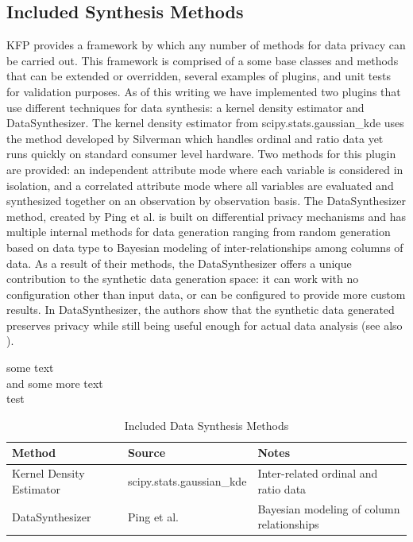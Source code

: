 \documentclass{amia}
\begin{document}
\subsection{Included Synthesis Methods}

KFP provides a framework by which any number of methods for data privacy can be carried out. This framework is comprised of a some base classes and methods that can be extended or overridden, several examples of plugins, and unit tests for validation purposes. As of this writing we have implemented two plugins that use different techniques for data synthesis: a kernel density estimator and DataSynthesizer. The kernel density estimator from scipy.stats.gaussian\_kde uses the method developed by Silverman \cite{silverman_density_1986} which handles ordinal and ratio data yet runs quickly on standard consumer level hardware. Two methods for this plugin are provided: an independent attribute mode where each variable is considered in isolation, and a correlated attribute mode where all variables are evaluated and synthesized together on an observation by observation basis. The DataSynthesizer method, created by Ping et al. \cite{ping17datasynthesizer} is built on differential privacy mechanisms and has multiple internal methods for data generation ranging from random generation based on data type to Bayesian modeling of inter-relationships among columns of data. As a result of their methods, the DataSynthesizer offers a unique contribution to the synthetic data generation space: it can work with no configuration other than input data, or can be configured to provide more custom results. In DataSynthesizer, the authors show that the synthetic data generated preserves privacy while still being useful enough for actual data analysis (see also \cite{howe_synthetic_2017}).

some text \\ and some more text \\ test

\begin{table}
   \caption{Included Data Synthesis Methods}
   \label{included-methods}
   \centering
   \begin{tabular}{p{12em} l p{20em}}
     \toprule
     Method                                 & Source                    & Notes \\
     \midrule
     Kernel Density Estimator               & scipy.stats.gaussian\_kde & Inter-related ordinal and ratio data\\
     DataSynthesizer                        & Ping et al.               & Bayesian modeling of column relationships\\
     \bottomrule
   \end{tabular}
 \end{table}
\end{document}
